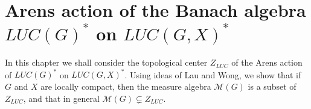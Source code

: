 


\pagebreak
\section{Arens action of the Banach algebra \\$LUC(G)^*$ on $LUC(G,X)^*$}\label{main:arens}

In this chapter we shall consider the topological center $Z_{LUC}$ of the Arens action
of $LUC(G)^*$ on $LUC(G,X)^*$.
Using ideas of Lau and Wong, we show that if
$G$ and $X$ are locally compact, then the measure algebra
$\mathcal{M}(G)$ is a subset of $Z_{LUC}$, and that in general $\mathcal{M}(G)\subsetneq Z_{LUC}$.

